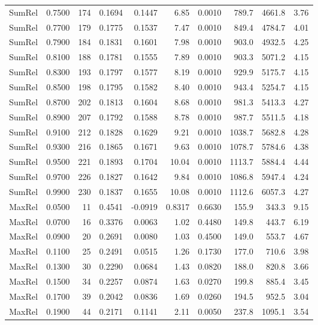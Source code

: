{\begin{longtable}{lrrrrrrrrr}
  SumRel & 0.7500 & 174 & 0.1694 & 0.1447 & 6.85 & 0.0010 & 789.7 & 4661.8 & 3.76 \\
  SumRel & 0.7700 & 179 & 0.1775 & 0.1537 & 7.47 & 0.0010 & 849.4 & 4784.7 & 4.01 \\
  SumRel & 0.7900 & 184 & 0.1831 & 0.1601 & 7.98 & 0.0010 & 903.0 & 4932.5 & 4.25 \\
  SumRel & 0.8100 & 188 & 0.1781 & 0.1555 & 7.89 & 0.0010 & 903.3 & 5071.2 & 4.15 \\
  SumRel & 0.8300 & 193 & 0.1797 & 0.1577 & 8.19 & 0.0010 & 929.9 & 5175.7 & 4.15 \\
  SumRel & 0.8500 & 198 & 0.1795 & 0.1582 & 8.40 & 0.0010 & 943.4 & 5254.7 & 4.15 \\
  SumRel & 0.8700 & 202 & 0.1813 & 0.1604 & 8.68 & 0.0010 & 981.3 & 5413.3 & 4.27 \\
  SumRel & 0.8900 & 207 & 0.1792 & 0.1588 & 8.78 & 0.0010 & 987.7 & 5511.5 & 4.18 \\
  SumRel & 0.9100 & 212 & 0.1828 & 0.1629 & 9.21 & 0.0010 & 1038.7 & 5682.8 & 4.28 \\
  SumRel & 0.9300 & 216 & 0.1865 & 0.1671 & 9.63 & 0.0010 & 1078.7 & 5784.6 & 4.38 \\
  SumRel & 0.9500 & 221 & 0.1893 & 0.1704 & 10.04 & 0.0010 & 1113.7 & 5884.4 & 4.44 \\
  SumRel & 0.9700 & 226 & 0.1827 & 0.1642 & 9.84 & 0.0010 & 1086.8 & 5947.4 & 4.24 \\
  SumRel & 0.9900 & 230 & 0.1837 & 0.1655 & 10.08 & 0.0010 & 1112.6 & 6057.3 & 4.27 \\
  MaxRel & 0.0500 & 11 & 0.4541 & -0.0919 & 0.8317 & 0.6630 & 155.9 & 343.3 & 9.15 \\
  MaxRel & 0.0700 & 16 & 0.3376 & 0.0063 & 1.02 & 0.4480 & 149.8 & 443.7 & 6.19 \\
  MaxRel & 0.0900 & 20 & 0.2691 & 0.0080 & 1.03 & 0.4500 & 149.0 & 553.7 & 4.67 \\
  MaxRel & 0.1100 & 25 & 0.2491 & 0.0515 & 1.26 & 0.1730 & 177.0 & 710.6 & 3.98 \\
  MaxRel & 0.1300 & 30 & 0.2290 & 0.0684 & 1.43 & 0.0820 & 188.0 & 820.8 & 3.66 \\
  MaxRel & 0.1500 & 34 & 0.2257 & 0.0874 & 1.63 & 0.0270 & 199.8 & 885.4 & 3.45 \\
  MaxRel & 0.1700 & 39 & 0.2042 & 0.0836 & 1.69 & 0.0260 & 194.5 & 952.5 & 3.04 \\
  MaxRel & 0.1900 & 44 & 0.2171 & 0.1141 & 2.11 & 0.0050 & 237.8 & 1095.1 & 3.54 \\

\end{longtable}}
